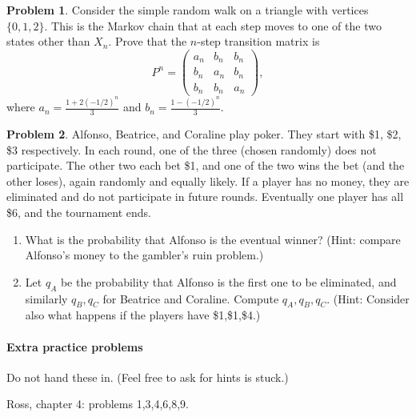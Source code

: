 \documentclass{article}
\theoremstyle{definition}
\newtheorem{problem}{Problem}
\begin{document}
\begin{problem}
  Consider the simple random walk on a triangle with vertices $\{0,1,2\}$.
  This is the Markov chain that at each step moves to one of the two states other than $X_n$.
  Prove that the $n$-step transition matrix is
  \[
    P^n = 
    \begin{pmatrix}
      a_n & b_n & b_n \\
      b_n & a_n & b_n \\
      b_n & b_n & a_n 
    \end{pmatrix}, \]
  where $a_n = \frac{1+2(-1/2)^n}{3}$ and $b_n = \frac{1-(-1/2)^n}{3}$.
\end{problem}

\begin{problem}
  Alfonso, Beatrice, and Coraline play poker.
  They start with \$1, \$2, \$3 respectively.
  In each round, one of the three (chosen randomly) does not participate.
  The other two each bet \$1, and one of the two wins the bet (and the other loses), again randomly and equally likely.
  If a player has no money, they are eliminated and do not participate in future rounds.
  Eventually one player has all \$6, and the tournament ends.
  \begin{enumerate}
  \item What is the probability that Alfonso is the eventual winner?
    (Hint: compare Alfonso's money to the gambler's ruin problem.)
  \item Let $q_A$ be the probability that Alfonso is the first one to be eliminated, and similarly $q_B,q_C$ for Beatrice and Coraline.
    Compute $q_A,q_B,q_C$.
    (Hint: Consider also what happens if the players have \$1,\$1,\$4.)
  \end{enumerate}
\end{problem}

\paragraph{Extra practice problems}
Do not hand these in. (Feel free to ask for hints is stuck.)

Ross, chapter 4: problems 1,3,4,6,8,9.
\end{document}
